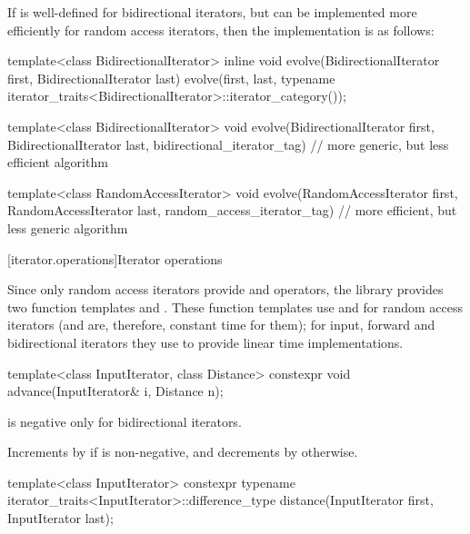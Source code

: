 \pnum
\begin{example}
If
is well-defined for bidirectional iterators, but can be implemented more
efficiently for random access iterators, then the implementation is as follows:

\begin{codeblock}
template<class BidirectionalIterator>
inline void
evolve(BidirectionalIterator first, BidirectionalIterator last) {
  evolve(first, last,
    typename iterator_traits<BidirectionalIterator>::iterator_category());
}

template<class BidirectionalIterator>
void evolve(BidirectionalIterator first, BidirectionalIterator last,
  bidirectional_iterator_tag) {
  // more generic, but less efficient algorithm
}

template<class RandomAccessIterator>
void evolve(RandomAccessIterator first, RandomAccessIterator last,
  random_access_iterator_tag) {
  // more efficient, but less generic algorithm
}
\end{codeblock}
\end{example}

[iterator.operations]{Iterator operations}

\pnum
Since only random access iterators provide
\tcode{+}
and
\tcode{-}
operators, the library provides two
function templates
and
.
These
function templates
use
\tcode{+}
and
\tcode{-}
for random access iterators (and are, therefore, constant
time for them); for input, forward and bidirectional iterators they use
\tcode{++}
to provide linear time
implementations.

%
\begin{itemdecl}
template<class InputIterator, class Distance>
  constexpr void advance(InputIterator& i, Distance n);
\end{itemdecl}

\begin{itemdescr}
\pnum
\expects
{}
is negative only for bidirectional iterators.

\pnum
\effects
Increments  by  if  is non-negative, and
decrements  by  otherwise.
\end{itemdescr}

%
\begin{itemdecl}
template<class InputIterator>
  constexpr typename iterator_traits<InputIterator>::difference_type
    distance(InputIterator first, InputIterator last);
\end{itemdecl}

